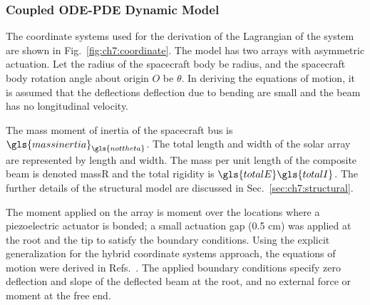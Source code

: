 \subsubsection{Coupled ODE-PDE Dynamic Model}

The coordinate systems used for the derivation of the Lagrangian of the system are shown in Fig.~\ref{fig:ch7:coordinate}. The model has two arrays with asymmetric actuation. Let the radius of the spacecraft body be \gls{radius}, and the spacecraft body rotation angle about origin $O$ be $\theta$. In deriving the equations of motion, it is assumed that the deflections \gls{deflection} due to bending are small and the beam has no longitudinal velocity.

The mass moment of inertia of the spacecraft bus is $\gls{massinertia}_{\gls{nottheta}}$. The total length and width of the solar array are represented by \gls{length} and \gls{width}. The mass per unit length of the composite beam is denoted \gls{massR} and the total rigidity is $\gls{totalE}\gls{totalI}$. The further details of the structural model are discussed in Sec.~\ref{sec:ch7:structural}.

The moment applied on the array is \gls{moment} over the locations where a piezoelectric actuator is bonded; a small actuation gap (0.5 cm) was applied at the root and the tip to satisfy the boundary conditions. Using the explicit generalization for the hybrid coordinate systems approach, the equations of motion were derived in Refs.~\cite{Nakka2016a, Chilan2017a}.
\noindent The applied boundary conditions specify zero deflection and slope of the deflected beam at the root, and no external force or moment at the free end.

